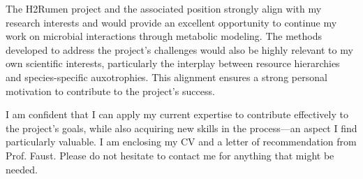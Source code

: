 The H2Rumen project and the associated position strongly align with my research interests and would provide an excellent opportunity to continue my work on microbial interactions through metabolic modeling. 
The methods developed to address the project's challenges would also be highly relevant to my own scientific interests, particularly the interplay between resource hierarchies and species-specific auxotrophies. 
This alignment ensures a strong personal motivation to contribute to the project's success.

\newpage\vspace*{0.3in} 

I am confident that I can apply my current expertise to contribute effectively to the project’s goals, while also acquiring new skills in the process—an aspect I find particularly valuable.
I am enclosing my CV and a letter of recommendation from Prof. Faust. 
Please do not hesitate to contact me for anything that might be needed. 

